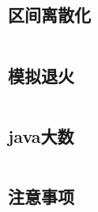 \documentclass[a4paper,11pt]{article}
\begin{document}
\subsection{区间离散化} 
\inputminted[breaklines]{c++}{其他/区间离散化.cpp}

\subsection{模拟退火} 
\inputminted[breaklines]{c++}{其他/模拟退火.cpp}

\subsection{java大数}
\inputminted[breaklines]{c++}{其他/java大数.cpp}

\subsection{注意事项}

\end{document}
